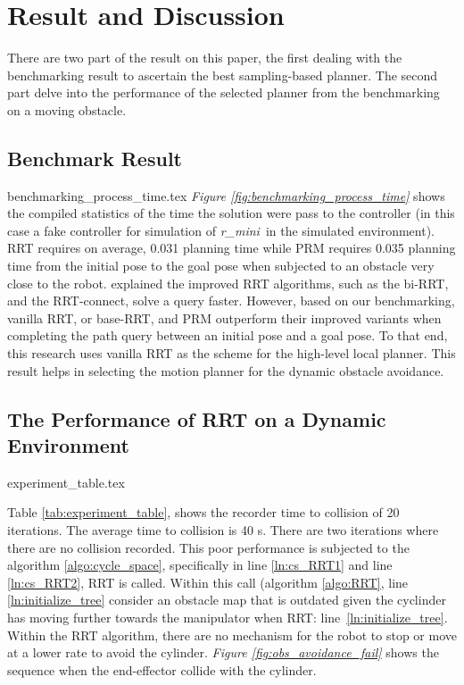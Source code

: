\documentclass[a4paper, 10pt]{article}
\newcommand\thisPaperDir{/home/asl/version-control/ws_thesis/writing_papers/resampling_planning_in_dynamic_environment}
\numberwithin{equation}{section} %
\newcommand\rimini[0]{\textit{r\_mini}} %
\begin{document}
{\section{Result and Discussion}
There are two part of the result on this paper, the first dealing
with the benchmarking result to ascertain the best 
sampling-based planner. The second part delve
into the performance of the selected planner 
from the benchmarking on a moving obstacle. 
\subsection{Benchmark Result}
{benchmarking_process_time.tex}
\textit{Figure \ref{fig:benchmarking_process_time}} shows the 
compiled statistics of the time the solution were pass to the 
controller (in this case a fake controller for simulation of 
\rimini \ in the simulated environment). RRT requires on average,
0.031 planning time while PRM requires 0.035 planning time from
the initial pose to the goal pose when subjected to an obstacle
very close to the robot. 
\textcite{Wei2018} explained the improved RRT algorithms, such as 
the bi-RRT, and the RRT-connect, 
solve a query faster. However, based on our benchmarking, 
vanilla RRT, or base-RRT, and PRM outperform their improved variants when
completing the path query between an initial pose and a goal pose. 
To that end, this research uses vanilla RRT as the scheme for the 
high-level local planner. 
This result helps in selecting the
motion planner for the dynamic obstacle avoidance. 

\subsection{The Performance of RRT on a Dynamic Environment}

{experiment_table.tex}

Table \ref{tab:experiment_table}, shows the recorder time to
collision of 20 iterations. The average time to collision is 40 s. 
There are two iterations where there are no collision recorded. This 
poor performance is subjected to the algorithm \ref{algo:cycle_space},
specifically in line \ref{ln:cs_RRT1} and line \ref{ln:cs_RRT2}, RRT is called.
Within this call (algorithm \ref{algo:RRT}, line \ref{ln:initialize_tree} consider
an obstacle map that is outdated 
given the cyclinder has moving further towards the manipulator when RRT: 
line~\ref{ln:initialize_tree}. 
Within the RRT algorithm, there are no mechanism for the robot to stop or move at 
a lower rate to avoid the cylinder. \textit{Figure \ref{fig:obs_avoidance_fail}} shows
the sequence when the end-effector collide with the cylinder. 

}
\end{document}
